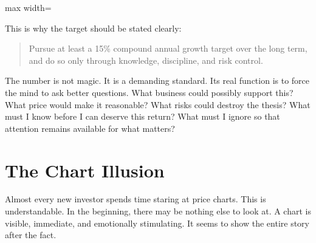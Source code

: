 \begin{center}
\begin{adjustbox}{max width=\linewidth}
\end{adjustbox}
\end{center}

This is why the target should be stated clearly:

\begin{quote}
Pursue at least a 15\% compound annual growth target over the long term, and do so only through knowledge, discipline, and risk control.
\end{quote}

The number is not magic. It is a demanding standard. Its real function is to force the mind to ask better questions. What business could possibly support this? What price would make it reasonable? What risks could destroy the thesis? What must I know before I can deserve this return? What must I ignore so that attention remains available for what matters?

\section*{The Chart Illusion}

Almost every new investor spends time staring at price charts. This is understandable. In the beginning, there may be nothing else to look at. A chart is visible, immediate, and emotionally stimulating. It seems to show the entire story after the fact.


